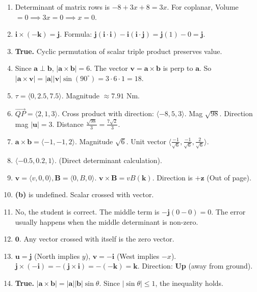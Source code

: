 \documentclass[11pt]{article}
\begin{document}
\begin{enumerate}
    \item Determinant of matrix rows is $-8 + 3x + 8 = 3x$. For coplanar, Volume $= 0 \implies 3x=0 \implies x=0$.
    \item $\mathbf{i} \times (-\mathbf{k}) = \mathbf{j}$. Formula: $\mathbf{j}(\mathbf{i}\cdot\mathbf{i}) - \mathbf{i}(\mathbf{i}\cdot\mathbf{j}) = \mathbf{j}(1) - 0 = \mathbf{j}$.
    \item \textbf{True.} Cyclic permutation of scalar triple product preserves value.
    \item Since $\mathbf{a} \perp \mathbf{b}$, $|\mathbf{a} \times \mathbf{b}| = 6$. The vector $\mathbf{v} = \mathbf{a} \times \mathbf{b}$ is perp to $\mathbf{a}$. So $|\mathbf{a} \times \mathbf{v}| = |\mathbf{a}||\mathbf{v}|\sin(90^\circ) = 3 \cdot 6 \cdot 1 = 18$.
    \item $\tau = \langle 0, 2.5, 7.5 \rangle$. Magnitude $\approx 7.91$ Nm.
    \item $\vec{QP} = \langle 2, 1, 3 \rangle$. Cross product with direction: $\langle -8, 5, 3 \rangle$. Mag $\sqrt{98}$. Direction mag $|\mathbf{u}| = 3$. Distance $\frac{\sqrt{98}}{3} = \frac{7\sqrt{2}}{3}$.
    \item $\mathbf{a} \times \mathbf{b} = \langle -1, -1, 2 \rangle$. Magnitude $\sqrt{6}$. Unit vector $\langle \frac{-1}{\sqrt{6}}, \frac{-1}{\sqrt{6}}, \frac{2}{\sqrt{6}} \rangle$.
    \item $\langle -0.5, 0.2, 1 \rangle$. (Direct determinant calculation).
    \item $\mathbf{v}=\langle v,0,0 \rangle, \mathbf{B}=\langle 0, B, 0 \rangle$. $\mathbf{v} \times \mathbf{B} = vB(\mathbf{k})$. Direction is $+\mathbf{z}$ (Out of page).
    \item \textbf{(b)} is undefined. Scalar crossed with vector.
    \item No, the student is correct. The middle term is $-\mathbf{j}(0-0) = 0$. The error usually happens when the middle determinant is non-zero.
    \item $\mathbf{0}$. Any vector crossed with itself is the zero vector.
    \item $\mathbf{u}=\mathbf{j}$ (North implies $y$), $\mathbf{v}=-\mathbf{i}$ (West implies $-x$). $\mathbf{j} \times (-\mathbf{i}) = -(\mathbf{j} \times \mathbf{i}) = -(-\mathbf{k}) = \mathbf{k}$. Direction: \textbf{Up} (away from ground).
    \item \textbf{True.} $|\mathbf{a} \times \mathbf{b}| = |\mathbf{a}||\mathbf{b}|\sin\theta$. Since $|\sin\theta| \le 1$, the inequality holds.
\end{enumerate}
\end{document}
